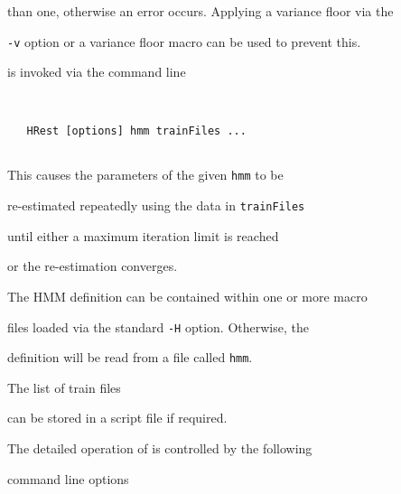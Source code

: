 than one, otherwise an error occurs.  Applying a variance floor via the


{\tt -v} option or a variance floor macro can be used to prevent this.










 is invoked via the command line


\begin{verbatim}


   HRest [options] hmm trainFiles ...


\end{verbatim}


This causes the parameters of the given {\tt hmm} to be


re-estimated repeatedly using the data in {\tt trainFiles} 


until either a maximum iteration limit is reached


or the re-estimation converges. 


The HMM definition can be contained within one or more macro


files loaded via the standard \texttt{-H} option.  Otherwise, the 


definition will be read from a file called \texttt{hmm}.


The list of train files


can be stored in a script file if required.





The detailed operation of  is controlled by the following


command line options


